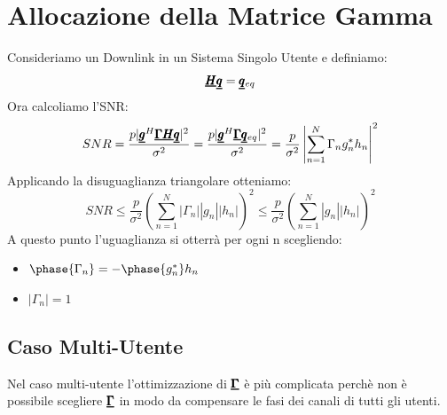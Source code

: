 \section{Allocazione della Matrice Gamma}
Consideriamo un Downlink in un Sistema Singolo Utente e definiamo:
\begin{equation*}
    \pmb{\underline{H}}\pmb{\underline{q}} = \pmb{\underline{q}}_{eq}
\end{equation*}
Ora calcoliamo l'SNR:
\begin{equation*}
    SNR = \frac{p|\pmb{\underline{g}}^H \pmb{\underline{\Gamma}} \pmb{\underline{H}} \pmb{\underline{q}}|^2}{\sigma^2} = \frac{p|\pmb{\underline{g}}^H \pmb{\underline{\Gamma}} \pmb{\underline{q}}_{eq}|^2}{\sigma^2} = \frac{p}{\sigma^2} \left|\sum_{n=1}^N \Gamma_n g_n^* h_n\right|^2 
\end{equation*}
Applicando la disuguaglianza triangolare otteniamo:
\begin{equation*}
    SNR \leq \frac{p}{\sigma^2} \left(\sum_{n=1}^N |\Gamma_n| |g_n| |h_n|\right)^2 \leq \frac{p}{\sigma^2} \left(\sum_{n=1}^N |g_n| |h_n|\right)^2 
\end{equation*}
A questo punto l'uguaglianza si otterrà per ogni n scegliendo:
\begin{itemize}
\item $\phase{\Gamma_n} = - \phase{g_n^*} h_n$
\item $|\Gamma_n| = 1 $
\end{itemize}

\subsection{Caso Multi-Utente}
Nel caso multi-utente l'ottimizzazione di $\pmb{\underline{\Gamma}}$ è più complicata perchè non è possibile scegliere $\pmb{\underline{\Gamma}}$ in modo da compensare le fasi dei canali di tutti gli utenti.
